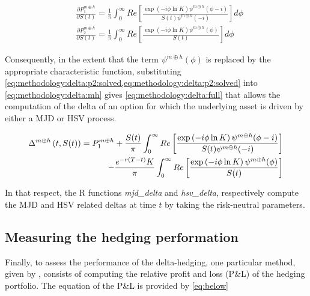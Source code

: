 \documentclass[12pt,a4paper]{report}
\begin{document}
\begin{align}
&\frac{\partial P_1^{m \oplus h}}{\partial S(t)} = 
  \frac{1}{\pi}
  \int_0^{\infty} Re \left[
    \frac{\exp\left( -i \phi \ln K \right) \psi^{m \oplus h}(\phi -i)}
      {S(t)\psi^{m \oplus h}(-i)}
  \right] d\phi \label{eq:methodology:delta:p1:solved} \\
&\frac{\partial P_2^{m \oplus h}}{\partial S(t)} =
\frac{1}{\pi}
  \int_0^{\infty} Re \left[
    \frac{\exp\left( -i \phi \ln K \right) \psi^{m \oplus h}(\phi)}
      {S(t)}
  \right]d\phi \label{eq:methodology:delta:p2:solved}
\end{align}

Consequently, in the extent that the term $\psi^{m \oplus h}(\phi)$ is replaced by the appropriate characteristic function, substituting \cref{eq:methodology:delta:p2:solved,eq:methodology:delta:p2:solved} into \ref{eq:methodology:delta:mh} gives \ref{eq:methodology:delta:full} that allows the computation of the delta of an option for which the underlying asset is driven by either a MJD or HSV process.


\begin{align}
  \Delta^{m \oplus h}\left(t, S(t)\right)  =
  P_1^{m \oplus h} + 
  \frac{S(t)}{\pi}
    \int_0^{\infty} Re \left[
    \frac{\exp\left( -i \phi \ln K \right) \psi^{m \oplus h}(\phi -i)}
      {S(t)\psi^{m \oplus h}(-i)}
  \right] \notag\\
    \mspace{150mu}
  - \frac{e^{-r(T-t)} K}{\pi}
    \int_0^{\infty} Re \left[
    \frac{\exp\left( -i \phi \ln K \right) \psi^{m \oplus h}(\phi)}
      {S(t)}
  \right]
\label{eq:methodology:delta:full}
\end{align}

In that respect, the R functions \textit{mjd\_delta} and \textit{hsv\_delta}, respectively compute the MJD and HSV related deltas at time $t$ by taking the risk-neutral parameters.




\subsection{Measuring the hedging performation}
\label{sec:methodology:measuring}

Finally, to assess the performance of the delta-hedging, one particular method, given by \citet{he2006calibration}, consists of computing the relative profit and loss (P\&L) of the hedging portfolio.
The equation of the P\&L is provided by \ref{eq:below}
\end{document}
